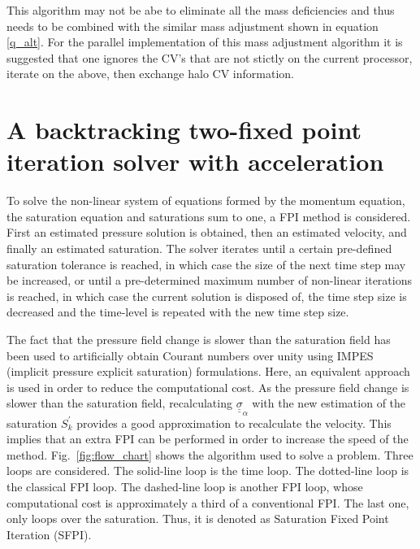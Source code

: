 This algorithm may not be abe to eliminate all the mass deficiencies and 
thus needs to be combined with the 
similar mass adjustment shown in equation \ref{q_alt}. 
For the parallel implementation of this mass adjustment algorithm it is suggested that 
one ignores the CV's that are not stictly on the current processor, iterate on the above, then exchange halo CV information.  


\pagebreak
\section{A backtracking two-fixed point iteration solver with acceleration}
\label{Non-linear_solver_backtracking}
To solve the non-linear system of equations formed by the momentum equation, the saturation equation and saturations sum to one, a FPI method is considered. First an estimated pressure solution is obtained, then an estimated velocity, and finally an estimated saturation. The solver iterates until a certain pre-defined saturation tolerance is reached, in which case the size of the next time step may be increased, or until a pre-determined maximum number of non-linear iterations is reached, in which case the current solution is disposed of, the time step size is decreased and the time-level is repeated with the new time step size.

The fact that the pressure field change is slower than the saturation field has been used to artificially obtain Courant numbers over unity using IMPES (implicit pressure explicit saturation) formulations. Here, an equivalent approach is used in order to reduce the computational cost. As the pressure field change is slower than the saturation field, recalculating ${\underline {\underline \sigma}}_{\alpha}$ with the new estimation of the saturation ${S^\prime_k}$ provides a good approximation to recalculate the velocity.
This implies that an extra FPI can be performed in order to increase the speed of the method. Fig.~\ref{fig:flow_chart} shows the algorithm used to solve a problem. Three loops are considered. The solid-line loop is the time loop. The dotted-line loop is the classical FPI loop. The dashed-line loop is another FPI loop, whose computational cost is approximately a third of a conventional FPI. The last one, only loops over the saturation. Thus, it is denoted as Saturation Fixed Point Iteration (SFPI). 

